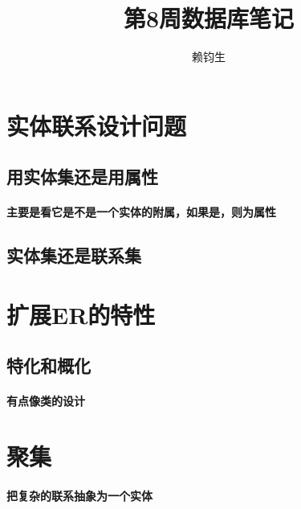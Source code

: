 \documentclass[UTF8]{article}
\title{第8周数据库笔记}
\author{赖钧生}
\begin{document}
  \maketitle
  
  \section{实体联系设计问题}%
  \label{sec:实体联系设计问题}
  
  \subsection{用实体集还是用属性}%
  \label{sub:用实体集还是用属性}
  
  \paragraph{主要是看它是不是一个实体的附属，如果是，则为属性}%
  \label{par:主要是看它是不是一个实体的附属_如果是_则为属性}
  
  \subsection{实体集还是联系集}%
  \label{sub:实体集还是联系集}
  
  \paragraph{}%
  \label{par:}
  
  \section{扩展ER的特性}%
  \label{sec:section_name_扩展er的特性}
  
  \subsection{特化和概化}%
  \label{sub:特化和概化}
  
  \paragraph{有点像类的设计}%
  \label{par:有点像类的设计}
  
  \section{聚集}%
  \label{sec:聚集}
  
  \paragraph{把复杂的联系抽象为一个实体}%
  \label{par:把复杂的联系抽象为一个实体}
  
  
  
\end{document}
